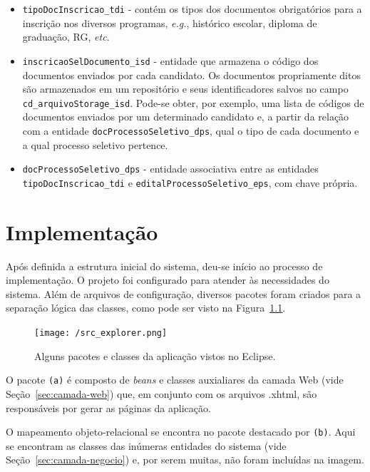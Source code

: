 \documentclass[
  10.5pt,				  %
	openright,			%
	twoside,			  %
  a5paper,
  chapter=TITLE,	%
	section=TITLE,	%
  hyphens,        %
	english,        %
	brazil          %
]{abntex2}
\begin{document}
\begin{itemize}
  \item \texttt{tipoDocInscricao\_tdi} - contém os tipos dos documentos obrigatórios para a inscrição nos diversos programas, \emph{e.g.}, histórico escolar, diploma de graduação, RG, \emph{etc}.
  \item \texttt{inscricaoSelDocumento\_isd} - entidade que armazena o código dos documentos enviados por cada candidato. Os documentos propriamente ditos são armazenados em um repositório e seus identificadores salvos no campo \texttt{cd\_arquivoStorage\_isd}. Pode-se obter, por exemplo, uma lista de códigos de documentos enviados por um determinado candidato e, a partir da relação com a entidade \texttt{docProcessoSeletivo\_dps}, qual o tipo de cada documento e a qual processo seletivo pertence.
  \item \texttt{docProcessoSeletivo\_dps} - entidade associativa entre as entidades \texttt{tipoDocInscricao\_tdi} e \texttt{editalProcessoSeletivo\_eps}, com chave própria.
\end{itemize}

\chapter{Implementação}

Após definida a estrutura inicial do sistema, deu-se início ao processo de implementação. O projeto foi configurado para atender às necessidades do sistema. Além de arquivos de configuração, diversos pacotes foram criados para a separação lógica das classes, como pode ser visto na Figura~\ref{fig:src_explorer}.

\begin{figure}[!ht]
  \caption{\label{fig:src_explorer} Alguns pacotes e classes da aplicação vistos no Eclipse. }
  \begin{center}
    \texttt{[image: /src\_explorer.png]}
  \end{center}
\end{figure}

O pacote \texttt{(a)} é composto de \emph{beans} e classes auxialiares da camada Web (vide Seção~\ref{sec:camada-web}) que, em conjunto com os arquivos .xhtml, são responsáveis por gerar as páginas da aplicação.

O mapeamento objeto-relacional se encontra no pacote destacado por \texttt{(b)}. Aqui se encontram as classes das inúmeras entidades do sistema (vide Seção~\ref{sec:camada-negocio}) e, por serem muitas, não foram incluídas na imagem.
\end{document}
